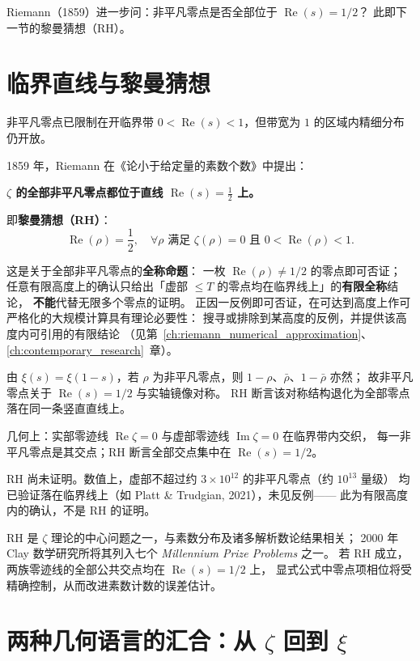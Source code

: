Riemann（1859）进一步问：非平凡零点是否全部位于 $\operatorname{Re}(s)=1/2$？
此即下一节的黎曼猜想（RH）。

\section{临界直线与黎曼猜想}\label{sec:critical_line_rh}

非平凡零点已限制在开临界带 $0<\operatorname{Re}(s)<1$，但带宽为 $1$ 的区域内精细分布仍开放。

1859 年，Riemann 在《论小于给定量的素数个数》中提出：
\begin{center}
\textbf{$\zeta$ 的全部非平凡零点都位于直线 $\operatorname{Re}(s)=\frac12$ 上。}
\end{center}
即\textbf{黎曼猜想（RH）}：
\[
\boxed{
\operatorname{Re}(\rho)=\frac12,\quad \forall \rho\text{ 满足 }\zeta(\rho)=0\text{ 且 }0<\operatorname{Re}(\rho)<1.
}
\]

这是关于全部非平凡零点的\textbf{全称命题}：
一枚 $\operatorname{Re}(\rho)\neq 1/2$ 的零点即可否证；
任意有限高度上的确认只给出「虚部 $\le T$ 的零点均在临界线上」的\textbf{有限全称}结论，
\textbf{不能}代替无限多个零点的证明。
正因一反例即可否证，在可达到高度上作可严格化的大规模计算具有理论必要性：
搜寻或排除到某高度的反例，并提供该高度内可引用的有限结论
（见第~\ref{ch:riemann_numerical_approximation}、\ref{ch:contemporary_research}~章）。

由 $\xi(s)=\xi(1-s)$，若 $\rho$ 为非平凡零点，则 $1-\rho$、$\bar\rho$、$1-\bar\rho$ 亦然；
故非平凡零点关于 $\operatorname{Re}(s)=1/2$ 与实轴镜像对称。
RH 断言该对称结构退化为全部零点落在同一条竖直直线上。

几何上：实部零迹线 $\operatorname{Re}\zeta=0$ 与虚部零迹线 $\operatorname{Im}\zeta=0$ 在临界带内交织，
每一非平凡零点是其交点；RH 断言全部交点集中在 $\operatorname{Re}(s)=1/2$。

RH 尚未证明。数值上，虚部不超过约 $3\times 10^{12}$ 的非平凡零点（约 $10^{13}$ 量级）
均已验证落在临界线上（如 Platt \& Trudgian, 2021），未见反例——
此为有限高度内的确认，不是 RH 的证明。

RH 是 $\zeta$ 理论的中心问题之一，与素数分布及诸多解析数论结果相关；
2000 年 Clay 数学研究所将其列入七个 \emph{Millennium Prize Problems} 之一。
若 RH 成立，两族零迹线的全部公共交点均在 $\operatorname{Re}(s)=1/2$ 上，
显式公式中零点项相位将受精确控制，从而改进素数计数的误差估计。

\section{两种几何语言的汇合：从 \texorpdfstring{$\zeta$}{Zeta} 回到 \texorpdfstring{$\xi$}{xi}}\label{sec:two-languages}

